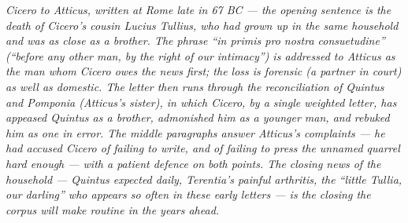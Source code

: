 
\textit{Cicero to Atticus, written at Rome late in 67 BC --- the
opening sentence is the death of Cicero's cousin Lucius Tullius,
who had grown up in the same household and was as close as a
brother. The phrase ``in primis pro nostra consuetudine''
(``before any other man, by the right of our intimacy'') is
addressed to Atticus as the man whom Cicero owes the news
first; the loss is forensic (a partner in court) as well as
domestic. The letter then runs through the reconciliation of
Quintus and Pomponia (Atticus's sister), in which Cicero, by a
single weighted letter, has appeased Quintus as a brother,
admonished him as a younger man, and rebuked him as one in
error. The middle paragraphs answer Atticus's complaints --- he
had accused Cicero of failing to write, and of failing to
press the unnamed quarrel hard enough --- with a patient
defence on both points. The closing news of the household ---
Quintus expected daily, Terentia's painful arthritis, the
``little Tullia, our darling'' who appears so often in these
early letters --- is the closing the corpus will make routine
in the years ahead.}
